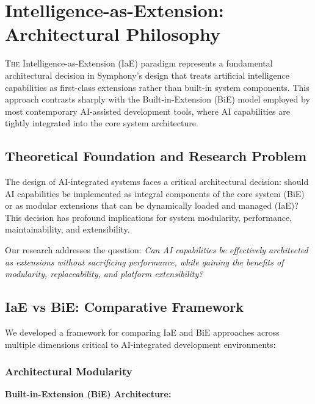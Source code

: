
\section{Intelligence-as-Extension: Architectural Philosophy}
\label{sec:iae-concept}

\lettrine{T}{he} Intelligence-as-Extension (IaE) paradigm represents a fundamental architectural decision in Symphony's design that treats artificial intelligence capabilities as first-class extensions rather than built-in system components. This approach contrasts sharply with the Built-in-Extension (BiE) model employed by most contemporary AI-assisted development tools, where AI capabilities are tightly integrated into the core system architecture.

\subsection{Theoretical Foundation and Research Problem}

The design of AI-integrated systems faces a critical architectural decision: should AI capabilities be implemented as integral components of the core system (BiE) or as modular extensions that can be dynamically loaded and managed (IaE)? This decision has profound implications for system modularity, performance, maintainability, and extensibility.

Our research addresses the question: \textit{Can AI capabilities be effectively architected as extensions without sacrificing performance, while gaining the benefits of modularity, replaceability, and platform extensibility?}

\subsection{IaE vs BiE: Comparative Framework}

We developed a framework for comparing IaE and BiE approaches across multiple dimensions critical to AI-integrated development environments:

\subsubsection{Architectural Modularity}

\textbf{Built-in-Extension (BiE) Architecture:}

